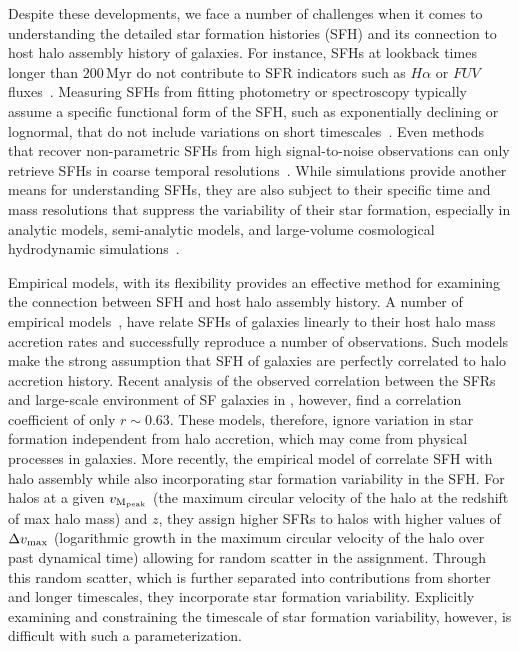 \documentclass[12pt, letterpaper, preprint, tighten]{aastex62}
\begin{document}
Despite these developments, we face a number of challenges when it comes 
to understanding the detailed star formation histories (SFH) and its 
connection to host halo assembly history of galaxies. 
For instance, SFHs at lookback times longer than $200\,\mathrm{Myr}$ 
do not contribute to SFR indicators such as $H\alpha$ or $FUV$ fluxes~\cite{sparre2017}.
Measuring SFHs from fitting photometry or spectroscopy typically 
assume a specific functional form of the SFH, such as exponentially 
declining or lognormal, that do not include variations on short 
timescales~\citep[\emph{e.g.}][]{wilkinson2017, carnall2018}. 
Even methods that recover non-parametric SFHs from high signal-to-noise 
observations can only retrieve SFHs in coarse temporal resolutions~\citep[\emph{e.g.}][]{tojeiro2009, leja2018a}. 
While simulations provide another means for understanding SFHs, 
they are also subject to their specific time and mass resolutions that 
suppress the variability of their star formation, especially in 
analytic models, semi-analytic models, and large-volume cosmological 
hydrodynamic simulations~\citep[][see also Figure~\ref{fig:illustris_sfh}]{sparre2015, sparre2017}.

Empirical models, with its flexibility provides an effective method for
examining the connection between SFH and host halo assembly history. A 
number of empirical models~\citep{taghizadeh-popp2015, becker2015, rodriguez-puebla2016a, mitra2017, cohn2017, moster2017}, 
have relate SFHs of galaxies linearly to their host halo mass accretion 
rates and successfully reproduce a number of observations. Such models 
make the strong assumption that SFH of galaxies are perfectly correlated 
to halo accretion history. Recent analysis of the observed correlation 
between the SFRs and large-scale environment of SF galaxies in \cite{tinker2018b}, 
however, find a correlation coefficient of only $r \sim 0.63$. These models, 
therefore, ignore variation in star formation independent from halo accretion, 
which may come from physical processes in galaxies. More recently, the empirical
model of \cite{behroozi2018} correlate SFH 
with halo assembly while also incorporating star formation variability in 
the SFH. For halos at a given $v_{\rm M_{peak}}$ (the maximum circular 
velocity of the halo at the redshift of max halo mass) and $z$, they 
assign higher SFRs to halos with higher values of $\Delta v_{\rm max}$ 
(logarithmic growth in the maximum circular velocity of the halo over past dynamical time)
allowing for random scatter in the assignment. Through this random scatter, 
which is further separated into contributions from shorter and longer timescales, 
they incorporate star formation variability. Explicitly examining and constraining 
the timescale of star formation variability, however, is difficult with such a 
parameterization.  
\end{document}
